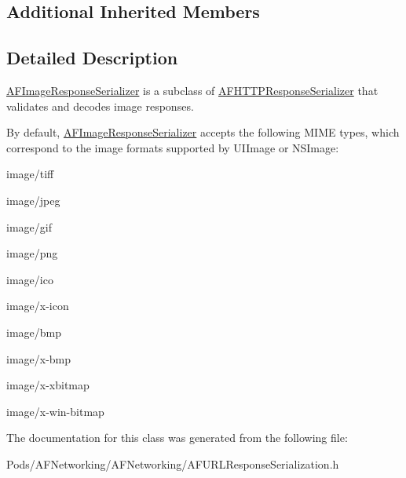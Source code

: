 \subsection*{Additional Inherited Members}


\subsection{Detailed Description}
{\ttfamily \mbox{\hyperlink{interface_a_f_image_response_serializer}{A\+F\+Image\+Response\+Serializer}}} is a subclass of {\ttfamily \mbox{\hyperlink{interface_a_f_h_t_t_p_response_serializer}{A\+F\+H\+T\+T\+P\+Response\+Serializer}}} that validates and decodes image responses.

By default, {\ttfamily \mbox{\hyperlink{interface_a_f_image_response_serializer}{A\+F\+Image\+Response\+Serializer}}} accepts the following M\+I\+ME types, which correspond to the image formats supported by U\+I\+Image or N\+S\+Image\+:


\begin{DoxyItemize}
\item {\ttfamily image/tiff}
\item {\ttfamily image/jpeg}
\item {\ttfamily image/gif}
\item {\ttfamily image/png}
\item {\ttfamily image/ico}
\item {\ttfamily image/x-\/icon}
\item {\ttfamily image/bmp}
\item {\ttfamily image/x-\/bmp}
\item {\ttfamily image/x-\/xbitmap}
\item {\ttfamily image/x-\/win-\/bitmap} 
\end{DoxyItemize}

The documentation for this class was generated from the following file\+:\begin{DoxyCompactItemize}
\item 
Pods/\+A\+F\+Networking/\+A\+F\+Networking/A\+F\+U\+R\+L\+Response\+Serialization.\+h\end{DoxyCompactItemize}

